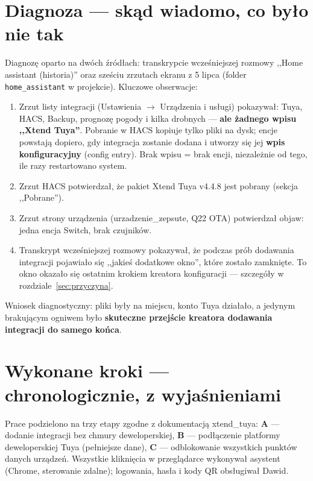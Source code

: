 \documentclass[11pt,a4paper]{article}
\begin{document}
\section{Diagnoza --- skąd wiadomo, co było nie tak}

Diagnozę oparto na dwóch źródłach: transkrypcie wcześniejszej rozmowy ,,Home assistant (historia)'' oraz sześciu zrzutach ekranu z 5 lipca (folder \texttt{home\_assistant} w projekcie). Kluczowe obserwacje:

\begin{enumerate}
\item Zrzut listy integracji (Ustawienia $\to$ Urządzenia i usługi) pokazywał: Tuya, HACS, Backup, prognozę pogody i kilka drobnych --- \textbf{ale żadnego wpisu ,,Xtend Tuya''}. Pobranie w HACS kopiuje tylko pliki na dysk; encje powstają dopiero, gdy integracja zostanie dodana i utworzy się jej \textbf{wpis konfiguracyjny} (config entry). Brak wpisu = brak encji, niezależnie od tego, ile razy restartowano system.
\item Zrzut HACS potwierdzał, że pakiet Xtend Tuya v4.4.8 jest pobrany (sekcja ,,Pobrane'').
\item Zrzut strony urządzenia (urzadzenie\_zepsute, Q22 OTA) potwierdzał objaw: jedna encja Switch, brak czujników.
\item Transkrypt wcześniejszej rozmowy pokazywał, że podczas prób dodawania integracji pojawiało się ,,jakieś dodatkowe okno'', które zostało zamknięte. To okno okazało się ostatnim krokiem kreatora konfiguracji --- szczegóły w rozdziale~\ref{sec:przyczyna}.
\end{enumerate}

Wniosek diagnostyczny: pliki były na miejscu, konto Tuya działało, a jedynym brakującym ogniwem było \textbf{skuteczne przejście kreatora dodawania integracji do samego końca}.

\section{Wykonane kroki --- chronologicznie, z wyjaśnieniami}

Prace podzielono na trzy etapy zgodne z dokumentacją xtend\_tuya: \textbf{A} --- dodanie integracji bez chmury deweloperskiej, \textbf{B} --- podłączenie platformy deweloperskiej Tuya (pełniejsze dane), \textbf{C} --- odblokowanie wszystkich punktów danych urządzeń. Wszystkie kliknięcia w przeglądarce wykonywał asystent (Chrome, sterowanie zdalne); logowania, hasła i kody QR obsługiwał Dawid.
\end{document}

